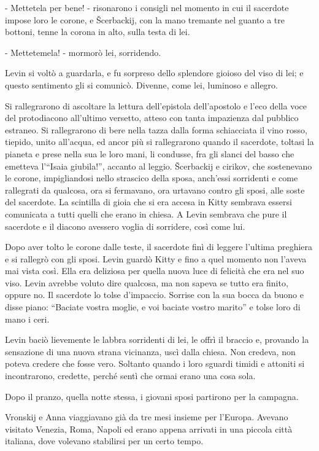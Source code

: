 - Mettetela per bene! - risonarono i consigli nel momento in cui il sacerdote impose loro le corone, e Šcerbackij, con la mano tremante nel guanto a tre bottoni, tenne la corona in alto, sulla testa di lei. 

- Mettetemela! - mormorò lei, sorridendo. 

Levin si voltò a guardarla, e fu sorpreso dello splendore gioioso del viso di lei; e questo sentimento gli si comunicò. Divenne, come lei, luminoso e allegro. 

Si rallegrarono di ascoltare la lettura dell'epistola dell'apostolo e l'eco della voce del protodiacono all'ultimo versetto, atteso con tanta impazienza dal pubblico estraneo. Si rallegrarono di bere nella tazza dalla forma schiacciata il vino rosso, tiepido, unito all'acqua, ed ancor più si rallegrarono quando il sacerdote, toltasi la pianeta e prese nella sua le loro mani, li condusse, fra gli slanci del basso che emetteva l'``Isaia giubila!'', accanto al leggio. Šcerbackij e cirikov, che sostenevano le corone, impigliandosi nello strascico della sposa, anch'essi sorridenti e come rallegrati da qualcosa, ora si fermavano, ora urtavano contro gli sposi, alle soste del sacerdote. La scintilla di gioia che si era accesa in Kitty sembrava essersi comunicata a tutti quelli che erano in chiesa. A Levin sembrava che pure il sacerdote e il diacono avessero voglia di sorridere, così come lui. 

Dopo aver tolto le corone dalle teste, il sacerdote finì di leggere l'ultima preghiera e si rallegrò con gli sposi. Levin guardò Kitty e fino a quel momento non l'aveva mai vista così. Ella era deliziosa per quella nuova luce di felicità che era nel suo viso. Levin avrebbe voluto dire qualcosa, ma non sapeva se tutto era finito, oppure no. Il sacerdote lo tolse d'impaccio. Sorrise con la sua bocca da buono e disse piano: ``Baciate vostra moglie, e voi baciate vostro marito'' e tolse loro di mano i ceri. 

Levin baciò lievemente le labbra sorridenti di lei, le offrì il braccio e, provando la sensazione di una nuova strana vicinanza, uscì dalla chiesa. Non credeva, non poteva credere che fosse vero. Soltanto quando i loro sguardi timidi e attoniti si incontrarono, credette, perché sentì che ormai erano una cosa sola. 

Dopo il pranzo, quella notte stessa, i giovani sposi partirono per la campagna. 

Vronskij e Anna viaggiavano già da tre mesi insieme per l'Europa. Avevano visitato Venezia, Roma, Napoli ed erano appena arrivati in una piccola città italiana, dove volevano stabilirsi per un certo tempo. 

